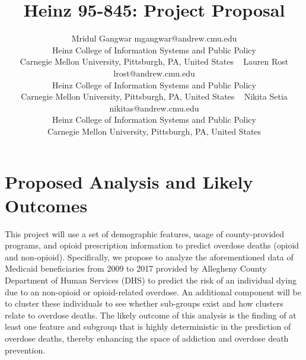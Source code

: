 \documentclass[twoside,10.5pt]{article}
\begin{document}
\title{Heinz 95-845: Project Proposal}

\author{\name Mridul Gangwar \email mgangwar@andrew.cmu.edu \\
       \addr Heinz College of Information Systems and Public Policy\\
       Carnegie Mellon University, Pittsburgh, PA, United States \
       \AND
       \name Lauren Rost \email lrost@andrew.cmu.edu \\
       \addr Heinz College of Information Systems and Public Policy\\
       Carnegie Mellon University, Pittsburgh, PA, United States \
       \AND
       \name Nikita Setia \email nikitas@andrew.cmu.edu \\
       \addr Heinz College of Information Systems and Public Policy\\
       Carnegie Mellon University, Pittsburgh, PA, United States}
       
\maketitle
\vspace*{5px}
\section{Proposed Analysis and Likely Outcomes}
This project will use a set of demographic features, usage of county-provided programs, and opioid prescription information to predict overdose deaths (opioid and non-opioid). Specifically, we propose to analyze the aforementioned data of Medicaid beneficiaries from 2009 to 2017 provided by Allegheny County Department of Human Services (DHS) to predict the risk of an individual dying due to an non-opioid or opioid-related overdose. An additional component will be to cluster these individuals to see whether sub-groups exist and how clusters relate to overdose deaths. The likely outcome of this analysis is the finding of at least one feature and subgroup that is highly deterministic in the prediction of overdose deaths, thereby enhancing the space of addiction and overdose death prevention. 
\end{document}
